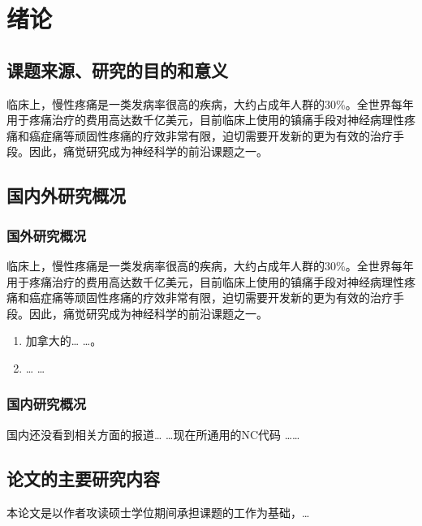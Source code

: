 \chapter{绪论} \label{chap:review}
\section{课题来源、研究的目的和意义} \label{sec:review:purpose}

临床上，慢性疼痛是一类发病率很高的疾病，大约占成年人群的30\%。全世界每年用于疼痛治疗的费用高达数千亿美元，目前临床上使用的镇痛手段对神经病理性疼痛和癌症痛等顽固性疼痛的疗效非常有限，迫切需要开发新的更为有效的治疗手段。因此，痛觉研究成为神经科学的前沿课题之一。


\section{国内外研究概况}\label{sec:review:current}
\subsection{国外研究概况}\label{subsec:review:current:foreign}
临床上，慢性疼痛是一类发病率很高的疾病，大约占成年人群的30\%。全世界每年用于疼痛治疗的费用高达数千亿美元，目前临床上使用的镇痛手段对神经病理性疼痛和癌症痛等顽固性疼痛的疗效非常有限，迫切需要开发新的更为有效的治疗手段。因此，痛觉研究成为神经科学的前沿课题之一。

\begin{enumerate}
\item 加拿大的… …。
\item … …
\end{enumerate}


\subsection{国内研究概况}\label{subsec:review:current:domestic}
国内还没看到相关方面的报道… …现在所通用的NC代码 \cite{vossel_spatial_2014} ……



\section{论文的主要研究内容}\label{sec:review:research}
本论文是以作者攻读硕士学位期间承担课题的工作为基础，…

